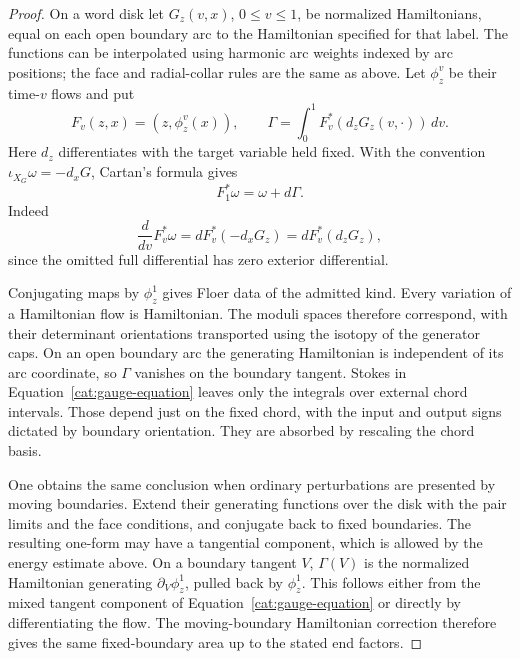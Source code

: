 \begin{proof}
On a word disk let \(G_z(v,x)\), \(0\le v\le1\), be normalized
Hamiltonians, equal on each open boundary arc to the Hamiltonian
specified for that label.  The functions can be interpolated using
harmonic arc weights indexed by arc positions; the face and
radial-collar rules are the same as above.  Let \(\phi_z^v\) be their
time-\(v\) flows and put
\[
 F_v(z,x)=(z,\phi_z^v(x)),\qquad
 \Gamma=\int_0^1 F_v^*(d_zG_z(v,\cdot))\,dv .
\]
Here \(d_z\) differentiates with the target variable held fixed.
With the convention \(\iota_{X_G}\omega=-d_xG\), Cartan's formula gives
\begin{equation}\label{cat:gauge-equation}
 F_1^*\omega=\omega+d\Gamma.
\end{equation}
Indeed
\[
 \frac d{dv}F_v^*\omega
 =dF_v^*(-d_xG_z)
 =dF_v^*(d_zG_z),
\]
since the omitted full differential has zero exterior differential.

Conjugating maps by \(\phi_z^1\) gives Floer data of the admitted kind.
Every variation of a Hamiltonian flow is Hamiltonian.  The moduli
spaces therefore correspond, with their determinant orientations
transported using the isotopy of the generator caps.  On an open
boundary arc the generating Hamiltonian is independent of its arc
coordinate, so \(\Gamma\) vanishes on the boundary tangent.
Stokes in Equation~\eqref{cat:gauge-equation} leaves only the integrals
over external chord intervals.  Those depend just on the fixed chord,
with the input and output signs dictated by boundary orientation.
They are absorbed by rescaling the chord basis.

One obtains the same conclusion when ordinary perturbations are
presented by moving boundaries.  Extend their generating functions over
the disk with the pair limits and the face conditions, and conjugate
back to fixed boundaries.  The resulting one-form may have a tangential
component, which is allowed by the energy estimate above.  On a
boundary tangent \(V\), \(\Gamma(V)\) is the normalized Hamiltonian
generating \(\partial_V\phi_z^1\), pulled back by \(\phi_z^1\).
This follows either from the mixed tangent component of
Equation~\eqref{cat:gauge-equation} or directly by differentiating the
flow.  The moving-boundary Hamiltonian correction therefore gives the
same fixed-boundary area up to the stated end factors.
\end{proof}

